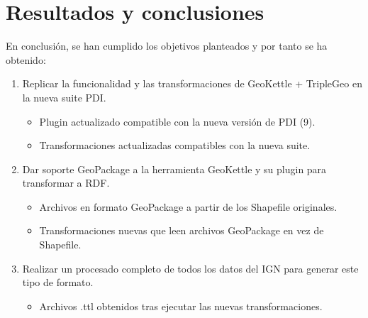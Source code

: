 \chapter{Resultados y conclusiones}

En conclusión, se han cumplido los objetivos planteados y por tanto se ha obtenido:

\begin{enumerate} 
    \item Replicar la funcionalidad y las transformaciones de GeoKettle + TripleGeo en la nueva suite PDI. 
        \begin{itemize}
        \item Plugin actualizado compatible con la nueva versión de PDI (9).
        \item Transformaciones actualizadas compatibles con la nueva suite.
        \end{itemize}

    \item Dar soporte GeoPackage a la herramienta GeoKettle y su plugin para transformar a RDF. 
        \begin{itemize}
        \item Archivos en formato GeoPackage a partir de los Shapefile originales.
        \item Transformaciones nuevas que leen archivos GeoPackage en vez de Shapefile.
        \end{itemize}

    \item Realizar un procesado completo de todos los datos del IGN para generar este tipo de formato. 
        \begin{itemize}
        \item Archivos .ttl obtenidos tras ejecutar las nuevas transformaciones.
        \end{itemize}
\end{enumerate}

